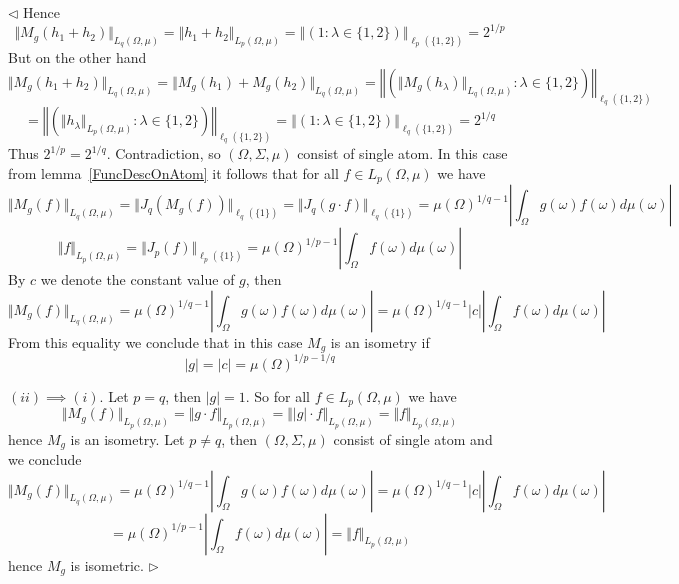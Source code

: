 \documentclass[12pt]{article}
\newenvironment{proof}{\par $\triangleleft$}{$\triangleright$}
\begin{document}
\begin{proof}
    Hence
    $$
        \Vert M_g(h_1+h_2)\Vert_{L_q(\Omega,\mu)} =\Vert
        h_1+h_2\Vert_{L_p(\Omega,\mu)} =\left\Vert\left( 1 :\lambda\in \{1,2
        \}\right)\right\Vert_{\ell_p( \{1,2 \})} =2^{1/p}
    $$
    But on the other hand
    $$
        \Vert M_g(h_1+h_2)\Vert_{L_q(\Omega,\mu)} =\Vert
        M_g(h_1)+M_g(h_2)\Vert_{L_q(\Omega,\mu)} =\left\Vert\left(\Vert
        M_g(h_\lambda)\Vert_{L_q(\Omega,\mu)}:\lambda\in \{1,2
        \}\right)\right\Vert_{\ell_q( \{1,2 \})}
    $$
    $$
        =\left\Vert\left(\Vert h_\lambda\Vert_{L_p(\Omega,\mu)}:\lambda\in \{1,2
        \}\right)\right\Vert_{\ell_q( \{1,2 \})} =\left\Vert\left(1:\lambda\in
        \{1,2 \}\right)\right\Vert_{\ell_q( \{1,2 \})} =2^{1/q}
    $$
    Thus $2^{1/p}=2^{1/q}$. Contradiction, so $(\Omega,\Sigma,\mu)$ consist of
    single atom. In this case from lemma~\ref{FuncDescOnAtom} it follows that
    for all $f\in L_p(\Omega,\mu)$ we have
    $$
        \Vert M_g(f)\Vert_{L_q(\Omega,\mu)} =\Vert J_q(M_g(f))\Vert_{\ell_q( \{1
            \})} =\Vert J_q(g\cdot f)\Vert_{\ell_q( \{1 \})}
        ={\mu(\Omega)}^{1/q-1}\left|\int_\Omega g(\omega)
        f(\omega)d\mu(\omega)\right|
    $$
    $$
        \Vert f\Vert_{L_p(\Omega,\mu)} =\Vert J_p(f)\Vert_{\ell_p( \{1 \})}
        ={\mu(\Omega)}^{1/p-1}\left|\int_\Omega f(\omega)d\mu(\omega)\right|
    $$
    By $c$ we denote the constant value of $g$, then
    $$
        \Vert M_g(f)\Vert_{L_q(\Omega,\mu)}
        ={\mu(\Omega)}^{1/q-1}\left|\int_\Omega g(\omega)
        f(\omega)d\mu(\omega)\right|
        ={\mu(\Omega)}^{1/q-1}|c|\left|\int_\Omega
        f(\omega)d\mu(\omega)\right|
    $$
    From this equality we conclude that in this case $M_g$ is an isometry if
    $$
        |g|=|c|={\mu(\Omega)}^{1/p-1/q}
    $$

    $(ii)\implies (i)$. Let $p=q$, then $|g|=1$. So for
    all $f\in L_p(\Omega,\mu)$ we have
    $$
        \Vert M_g(f)\Vert_{L_p(\Omega,\mu)} =\Vert g\cdot
        f\Vert_{L_p(\Omega,\mu)} =\Vert |g|\cdot f\Vert_{L_p(\Omega,\mu)} 
        =\Vert f\Vert_{L_p(\Omega,\mu)}
    $$
    hence $M_g$ is an isometry. Let $p\neq q$, then $(\Omega,\Sigma,\mu)$
    consist of single atom and we conclude
    $$
        \Vert M_g(f)\Vert_{L_q(\Omega,\mu)}
        ={\mu(\Omega)}^{1/q-1}\left|\int_\Omega g(\omega)
        f(\omega)d\mu(\omega)\right|={\mu(\Omega)}^{1/q-1}|c|\left|\int_\Omega
        f(\omega)d\mu(\omega)\right|
    $$
    $$
        ={\mu(\Omega)}^{1/p-1}\left|\int_\Omega f(\omega)d\mu(\omega)\right|
        =\Vert f\Vert_{L_p(\Omega,\mu)}
    $$
    hence $M_g$ is isometric.
\end{proof}
\end{document}
